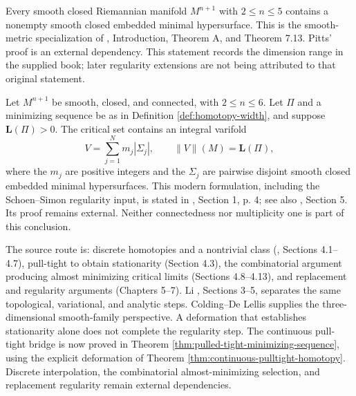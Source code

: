 \begin{theorem}\label{thm:pitts-existence}
Every smooth closed Riemannian manifold $M^{n+1}$ with $2\leq n\leq5$ contains a nonempty smooth closed embedded minimal hypersurface. This is the smooth-metric specialization of \cite{Pitts81}, Introduction, Theorem A, and Theorem 7.13. Pitts' proof is an external dependency. This statement records the dimension range in the supplied book; later regularity extensions are not being attributed to that original statement.
\end{theorem}

\begin{theorem}\label{thm:ap-realization}
Let $M^{n+1}$ be smooth, closed, and connected, with $2\leq n\leq6$. Let $\Pi$ and a minimizing sequence be as in Definition \ref{def:homotopy-width}, and suppose $\mathbf L(\Pi)>0$. The critical set contains an integral varifold
\[
 V=\sum_{j=1}^N m_j|\Sigma_j|,\qquad
 \|V\|(M)=\mathbf L(\Pi),
\]
where the $m_j$ are positive integers and the $\Sigma_j$ are pairwise disjoint smooth closed embedded minimal hypersurfaces. This modern formulation, including the Schoen--Simon regularity input, is stated in \cite{MNIndex}, Section 1, p. 4; see also \cite{LiAP}, Section 5. Its proof remains external. Neither connectedness nor multiplicity one is part of this conclusion.
\end{theorem}

\begin{remark}\label{rem:pitts-proof-route}
The source route is: discrete homotopies and a nontrivial class (\cite{Pitts81}, Sections 4.1--4.7), pull-tight to obtain stationarity (Section 4.3), the combinatorial argument producing almost minimizing critical limits (Sections 4.8--4.13), and replacement and regularity arguments (Chapters 5--7). Li \cite{LiAP}, Sections 3--5, separates the same topological, variational, and analytic steps. Colding--De Lellis \cite{CDL} supplies the three-dimensional smooth-family perspective. A deformation that establishes stationarity alone does not complete the regularity step. The continuous pull-tight bridge is now proved in Theorem \ref{thm:pulled-tight-minimizing-sequence}, using the explicit deformation of Theorem \ref{thm:continuous-pulltight-homotopy}. Discrete interpolation, the combinatorial almost-minimizing selection, and replacement regularity remain external dependencies.
\end{remark}
